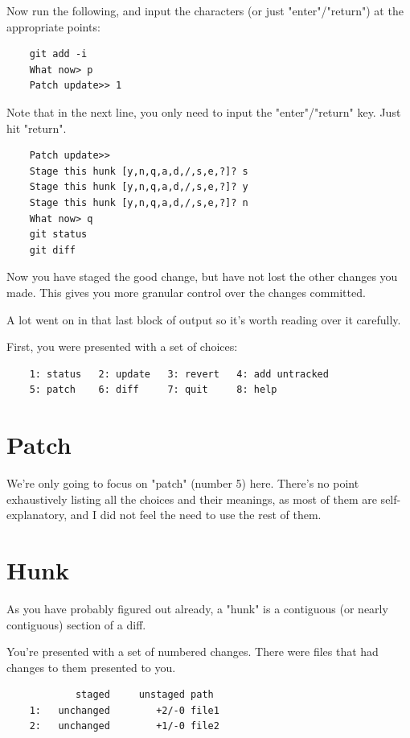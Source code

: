 \documentclass{report}
\begin{document}
Now run the following, and input the characters (or just "enter"/"return") at the appropriate points:

\begin{lstlisting}
    git add -i
    What now> p
    Patch update>> 1
\end{lstlisting}

Note that in the next line, you only need to input the "enter"/"return" key. Just hit "return".

\begin{lstlisting}
    Patch update>>
    Stage this hunk [y,n,q,a,d,/,s,e,?]? s
    Stage this hunk [y,n,q,a,d,/,s,e,?]? y
    Stage this hunk [y,n,q,a,d,/,s,e,?]? n
    What now> q
    git status
    git diff
\end{lstlisting}

Now you have staged the good change, but have not lost the other changes you made. This gives you more granular control over the changes committed.

A lot went on in that last block of output so it's worth reading over it carefully.

First, you were presented with a set of choices:

\begin{lstlisting}
    1: status   2: update   3: revert   4: add untracked
    5: patch    6: diff     7: quit     8: help
\end{lstlisting}

\section{Patch}
We're only going to focus on "patch" (number 5) here. There's no point exhaustively listing all the choices and their meanings, as most of them are self-explanatory, and I did not feel the need to use the rest of them.

\section{Hunk}
As you have probably figured out already, a "hunk" is a contiguous (or nearly contiguous) section of a diff.

You're presented with a set of numbered changes. There were files that had changes to them presented to you.

\begin{lstlisting}
            staged     unstaged path
    1:   unchanged        +2/-0 file1
    2:   unchanged        +1/-0 file2
\end{lstlisting}
\end{document}
